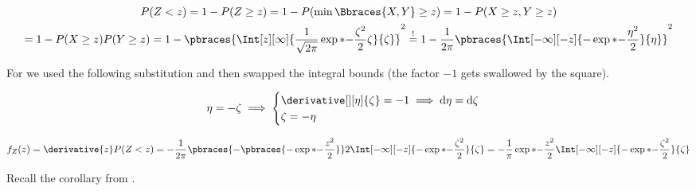 \begin{solution}

\begin{multline*}
    P(Z < z)
    =
    1 - P(Z \geq z)
    =
    1 - P(\min \Bbraces{X, Y} \geq z)
    =
    1 - P(X \geq z, Y \geq z) \\
    =
    1 - P(X \geq z) P(Y \geq z)
    =
    1 - \pbraces{\Int[z][\infty]{\frac{1}{\sqrt{2 \pi}} \exp*{-\frac{\zeta^2}{2}}{\zeta}}{\zeta}}^2
    \stackrel{!}{=}
    1 - \frac{1}{2 \pi} \pbraces{\Int[-\infty][-z]{-\exp*{-\frac{\eta^2}{2}}}{\eta}}^2
\end{multline*}

For \Quote{!} we used the following substitution and then swapped the integral bounds (the factor $-1$ gets swallowed by the square).

\begin{align*}
    \eta = -\zeta
    \implies
    \begin{cases}
        \derivative[][\eta]{\zeta} = -1 \implies \mathrm d \eta = \mathrm d \zeta \\
        \zeta = -\eta
    \end{cases}
\end{align*}

\begin{align*}
    f_Z(z)
    =
    \derivative{z}
        P(Z < z)
    =
    -\frac{1}{2 \pi}
    \pbraces
    {
        -
        \pbraces
        {
            -\exp*{-\frac{z^2}{2}}
        }
    }
    2
    \Int[-\infty][-z]
    {
        -\exp*{-\frac{\zeta^2}{2}}
    }{\zeta}
    =
    -\frac{1}{\pi}
    \exp*{-\frac{z^2}{2}}
    \Int[-\infty][-z]
    {
        -\exp*{-\frac{\zeta^2}{2}}
    }{\zeta}
\end{align*}

Recall the corollary from \cite[Lecture 3, Slide 42]{EStat}.


\end{solution}
